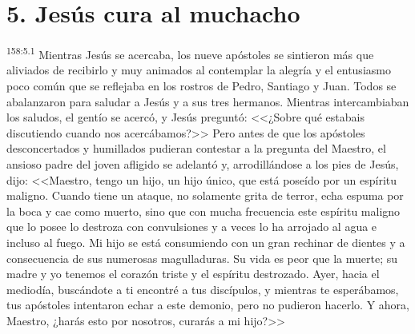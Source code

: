 \section*{5. Jesús cura al muchacho}
\par 
\textsuperscript{158:5.1} Mientras Jesús se acercaba, los nueve apóstoles se sintieron más que aliviados de recibirlo y muy animados al contemplar la alegría y el entusiasmo poco común que se reflejaba en los rostros de Pedro, Santiago y Juan. Todos se abalanzaron para saludar a Jesús y a sus tres hermanos. Mientras intercambiaban los saludos, el gentío se acercó, y Jesús preguntó: <<¿Sobre qué estabais discutiendo cuando nos acercábamos?>> Pero antes de que los apóstoles desconcertados y humillados pudieran contestar a la pregunta del Maestro, el ansioso padre del joven afligido se adelantó y, arrodillándose a los pies de Jesús, dijo: <<Maestro, tengo un hijo, un hijo único, que está poseído por un espíritu maligno. Cuando tiene un ataque, no solamente grita de terror, echa espuma por la boca y cae como muerto, sino que con mucha frecuencia este espíritu maligno que lo posee lo destroza con convulsiones y a veces lo ha arrojado al agua e incluso al fuego. Mi hijo se está consumiendo con un gran rechinar de dientes y a consecuencia de sus numerosas magulladuras. Su vida es peor que la muerte; su madre y yo tenemos el corazón triste y el espíritu destrozado. Ayer, hacia el mediodía, buscándote a ti encontré a tus discípulos, y mientras te esperábamos, tus apóstoles intentaron echar a este demonio, pero no pudieron hacerlo. Y ahora, Maestro, ¿harás esto por nosotros, curarás a mi hijo?>>

